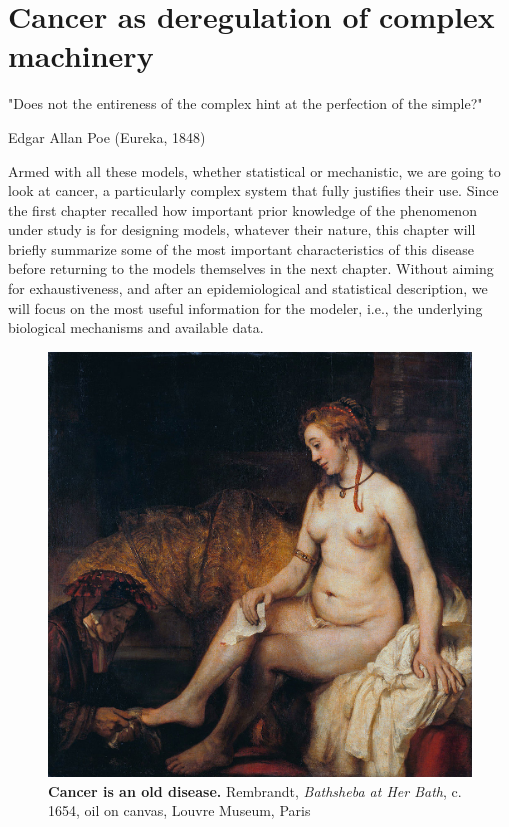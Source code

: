 \documentclass[a4paper,12pt,twoside,onecolumn,openright,final,oldfontcommands]{memoir}
\newcommand{\initial}[1]{
	\lettrine[lines=3,lhang=0.33,nindent=0em]{
		\color{gray}
     		{\textsc{#1}}}{}}
\begin{document}
\chapter{Cancer as deregulation of complex
machinery}\label{cancer-as-deregulation-of-complex-machinery}

\epigraph{"Does not the entireness of the complex hint at the perfection of the simple?"}{Edgar Allan Poe (Eureka, 1848)}

\initial{A}rmed with all these models, whether statistical or
mechanistic, we are going to look at cancer, a particularly complex
system that fully justifies their use. Since the first chapter recalled
how important prior knowledge of the phenomenon under study is for
designing models, whatever their nature, this chapter will briefly
summarize some of the most important characteristics of this disease
before returning to the models themselves in the next chapter. Without
aiming for exhaustiveness, and after an epidemiological and statistical
description, we will focus on the most useful information for the
modeler, i.e., the underlying biological mechanisms and available data.

\begin{figure}

{\centering \includegraphics[width=0.9\linewidth]{fig/bath} 

}

\caption[Cancer is an old disease]{\textbf{Cancer is an old disease.} Rembrandt,
\emph{Bathsheba at Her Bath}, c. 1654, oil on canvas, Louvre Museum,
Paris}\label{fig:bath}
\end{figure}
\end{document}
